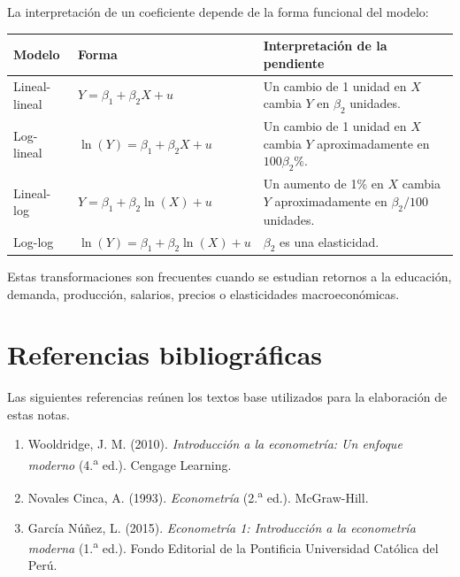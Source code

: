 \documentclass[11pt,a4paper]{article}
\begin{document}
La interpretación de un coeficiente depende de la forma funcional del modelo:

\begin{center}
\small
\renewcommand{\arraystretch}{1.45}
\begin{tabular}{@{}p{2.4cm}p{4.0cm}p{7.1cm}@{}}
\toprule
\textbf{Modelo} & \textbf{Forma} & \textbf{Interpretación de la pendiente} \\
\midrule
Lineal-lineal & \(Y=\beta_1+\beta_2X+u\) & Un cambio de 1 unidad en \(X\) cambia \(Y\) en \(\beta_2\) unidades. \\
Log-lineal & \(\ln(Y)=\beta_1+\beta_2X+u\) & Un cambio de 1 unidad en \(X\) cambia \(Y\) aproximadamente en \(100\beta_2\%\). \\
Lineal-log & \(Y=\beta_1+\beta_2\ln(X)+u\) & Un aumento de 1\% en \(X\) cambia \(Y\) aproximadamente en \(\beta_2/100\) unidades. \\
Log-log & \(\ln(Y)=\beta_1+\beta_2\ln(X)+u\) & \(\beta_2\) es una elasticidad. \\
\bottomrule
\end{tabular}
\end{center}

Estas transformaciones son frecuentes cuando se estudian retornos a la educación, demanda, producción, salarios, precios o elasticidades macroeconómicas.

\section{Referencias bibliográficas}

Las siguientes referencias reúnen los textos base utilizados para la elaboración de estas notas.



\begin{enumerate}[label=\arabic*.]
    \item Wooldridge, J. M. (2010). \textit{Introducción a la econometría: Un enfoque moderno} (4.\textsuperscript{a} ed.). Cengage Learning.
    \item Novales Cinca, A. (1993). \textit{Econometría} (2.\textsuperscript{a} ed.). McGraw-Hill.
    \item García Núñez, L. (2015). \textit{Econometría 1: Introducción a la econometría moderna} (1.\textsuperscript{a} ed.). Fondo Editorial de la Pontificia Universidad Católica del Perú.
\end{enumerate}
\end{document}
